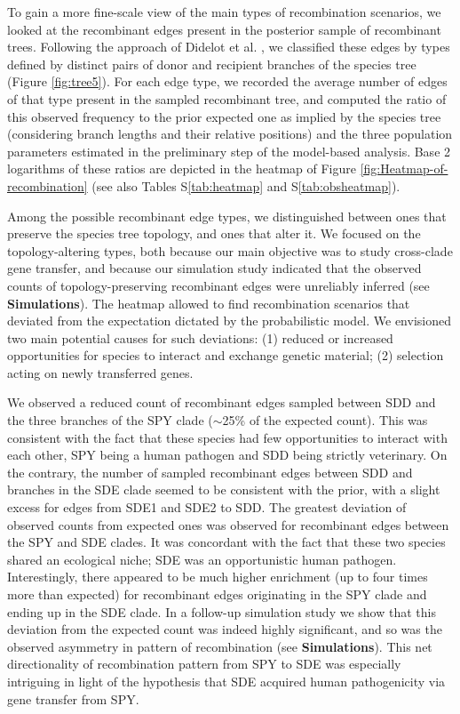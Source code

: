 \documentclass[10pt]{article}
\begin{document}
To gain a more fine-scale view of the main types of recombination scenarios, we
looked at the recombinant edges present in the posterior sample of recombinant
trees. Following the approach of Didelot et al. \cite{Didelot2010}, we
classified these edges by types defined by distinct pairs of donor and recipient
branches of the species tree (Figure \ref{fig:tree5}). For each edge type, we
recorded the average number of edges of that type present in the sampled
recombinant tree, and computed the ratio of this observed frequency to the prior
expected one as implied by the species tree (considering branch lengths and
their relative positions) and the three population parameters estimated in the
preliminary step of the model-based analysis.  Base 2 logarithms of these ratios
are depicted in the heatmap of Figure \ref{fig:Heatmap-of-recombination} (see
also Tables S\ref{tab:heatmap} and S\ref{tab:obsheatmap}).

Among the possible recombinant edge types, we distinguished between ones that
preserve the species tree topology, and ones that alter it. We focused on the
topology-altering types, both because our main objective was to study
cross-clade gene transfer, and because our simulation study indicated that the
observed counts of topology-preserving recombinant edges were unreliably
inferred (see \textbf{Simulations}). The heatmap allowed to find recombination
scenarios that deviated from the expectation dictated by the probabilistic
model.  We envisioned two main potential causes for such deviations: (1) reduced
or increased opportunities for species to interact and exchange genetic
material; (2) selection acting on newly transferred genes. 

We observed a reduced count of recombinant edges sampled between SDD and the
three branches of the SPY clade ($\sim$25\% of the expected count). This was
consistent with the fact that these species had few opportunities to interact
with each other, SPY being a human pathogen and SDD being strictly veterinary.
On the contrary, the number of sampled recombinant edges between SDD and
branches in the SDE clade seemed to be consistent with the prior, with a slight
excess for edges from SDE1 and SDE2 to SDD.  The greatest deviation of observed
counts from expected ones was observed for recombinant edges between the SPY and
SDE clades. It was concordant with the fact that these two species shared an
ecological niche; SDE was an opportunistic human pathogen. Interestingly, there
appeared to be much higher enrichment (up to four times more than expected) for
recombinant edges originating in the SPY clade and ending up in the SDE clade.
In a follow-up simulation study we show that this deviation from the expected
count was indeed highly significant, and so was the observed asymmetry in
pattern of recombination (see \textbf{Simulations}).  This net directionality of
recombination pattern from SPY to SDE was especially intriguing in light of the
hypothesis that SDE acquired human pathogenicity via gene transfer from SPY.
\end{document}
